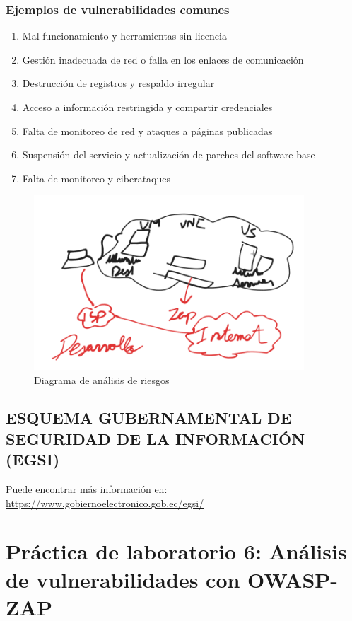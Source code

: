 \documentclass[12pt,a4paper]{article}
\begin{document}
\subsubsection{Ejemplos de vulnerabilidades comunes}
\begin{enumerate}
    \item Mal funcionamiento y herramientas sin licencia
    \item Gestión inadecuada de red o falla en los enlaces de comunicación
    \item Destrucción de registros y respaldo irregular
    \item Acceso a información restringida y compartir credenciales
    \item Falta de monitoreo de red y ataques a páginas publicadas
    \item Suspensión del servicio y actualización de parches del software base
    \item Falta de monitoreo y ciberataques
\end{enumerate}

\begin{figure}[H]
\centering
\includegraphics[width=0.9\textwidth]{dibujo_practica.png}
\caption{Diagrama de análisis de riesgos}
\label{fig:dibujo_practica}
\end{figure}

\subsection{ESQUEMA GUBERNAMENTAL DE SEGURIDAD DE LA INFORMACIÓN (EGSI)}

Puede encontrar más información en: \url{https://www.gobiernoelectronico.gob.ec/egsi/}

\section{Práctica de laboratorio 6: Análisis de vulnerabilidades con OWASP-ZAP}
\end{document}
